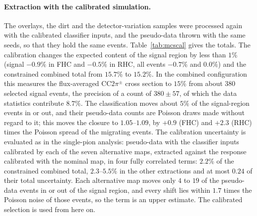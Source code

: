 \documentclass[11pt,a4paper]{article}
\begin{document}
\paragraph{Extraction with the calibrated simulation.} The overlays, the dirt and the detector-variation
samples were processed again with the calibrated classifier inputs, and the pseudo-data thrown with the
same seeds, so that they hold the same events. Table~\ref{tab:mcscal} gives the totals. The calibration
changes the expected content of the signal region by less than $1\%$ (signal $-0.9\%$ in FHC and $-0.5\%$
in RHC, all events $-0.7\%$ and $0.0\%$) and the constrained combined total from $15.7\%$ to $15.2\%$. In the
combined configuration this measures the flux-averaged CC$2\pi^\pm$ cross section to $15\%$ from about $380$
selected signal events, the precision of a count of $380\pm57$, of which the data statistics contribute $8.7\%$. The
classification moves about $5\%$ of the signal-region events in or out, and their pseudo-data counts are
Poisson draws made without regard to it; this moves the closure to $1.05$--$1.09$, by $+0.9$ (FHC) and
$+2.3$ (RHC) times the Poisson spread of the migrating events. The calibration uncertainty is evaluated
as in the single-pion analysis: pseudo-data with the classifier inputs calibrated by each of the seven
alternative maps, extracted against the response calibrated with the nominal map, in four fully
correlated terms: $2.2\%$ of the constrained combined total, $2.3$--$5.5\%$ in the other extractions and at
most $0.24$ of their total uncertainty. Each alternative map moves only $4$ to $19$ of the pseudo-data
events in or out of the signal region, and every shift lies within $1.7$ times the Poisson noise of
those events, so the term is an upper estimate. The calibrated selection is used from here on.
\end{document}
